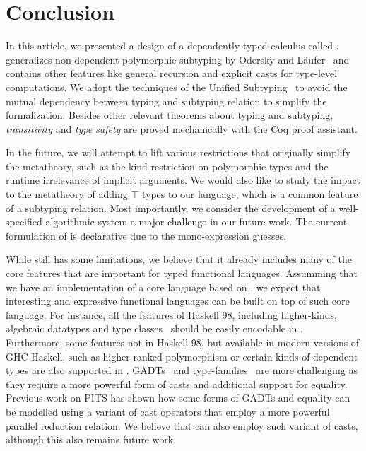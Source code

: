 \section{Conclusion}

In this article, we presented a design of a dependently-typed calculus called \name.
\name generalizes non-dependent polymorphic subtyping by Odersky and
L\"aufer~\citep{odersky1996putting} and contains other features like general
recursion and explicit casts for type-level computations.
We adopt the techniques of the Unified Subtyping~\citep{full} to
avoid the mutual dependency between typing and subtyping relation to simplify
the formalization. Besides other relevant theorems about typing and subtyping,
\emph{transitivity} and \emph{type safety} are proved mechanically with the Coq
proof assistant.

In the future, we will attempt to lift various restrictions that originally simplify
the metatheory, such as the kind restriction on polymorphic
types and the runtime irrelevance of implicit arguments. We would also like to
study the impact to the metatheory of adding $\top$ types to our language,
which is a common feature of a subtyping relation.
Most importantly, we consider the development
of a well-specified algorithmic system a major challenge in our future
work. The current formulation of \name is declarative due to the mono-expression guesses.

While \name still has some limitations, we believe that it already includes many
of the core features that are important for typed functional languages.
Assumming that we have an implementation of a core language based on \name,
we expect that interesting and expressive functional languages can be built
on top of such core language. For instance, all the features of Haskell 98,
including higher-kinds, algebraic datatypes and type classes~\citep{typeclasseskaes,typeclasseswadler}
should be easily encodable
in \name. Furthermore, some features not in Haskell 98, but available in modern
versions of GHC Haskell, such as higher-ranked polymorphism or certain
kinds of dependent types are also supported in \name. GADTs~\citep{gadt1,gadt2} and
type-families~\citep{typefamilies} are more challenging as they require a more powerful
form of casts and additional support for equality. Previous work on PITS
has shown how some forms of GADTs and equality can be modelled using
a variant of cast operators that employ a more powerful parallel reduction
relation. We believe that \name can also employ such variant of casts,
although this also remains future work.
